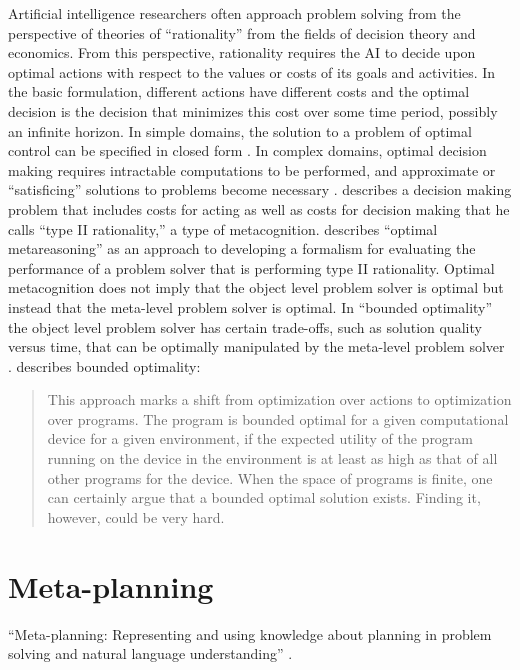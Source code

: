 Artificial intelligence researchers often approach problem solving
from the perspective of theories of ``rationality'' from the fields of
decision theory and economics.  From this perspective, rationality
requires the AI to decide upon optimal actions with respect to the
values or costs of its goals and activities.  In the basic
formulation, different actions have different costs and the optimal
decision is the decision that minimizes this cost over some time
period, possibly an infinite horizon.  In simple domains, the solution
to a problem of optimal control can be specified in closed form
\cite[]{bertsekas:1995}.  In complex domains, optimal decision making
requires intractable computations to be performed, and approximate or
``satisficing'' solutions to problems become necessary
\cite[]{simon:1957,simon:1982}.  \cite{good:1971} describes a decision
making problem that includes costs for acting as well as costs for
decision making that he calls ``type II rationality,'' a type of
metacognition.  \cite{zilberstein:2008} describes ``optimal
metareasoning'' as an approach to developing a formalism for
evaluating the performance of a problem solver that is performing type
II rationality.  Optimal metacognition does not imply that the object
level problem solver is optimal but instead that the meta-level
problem solver is optimal.  In ``bounded optimality'' the object level
problem solver has certain trade-offs, such as solution quality versus
time, that can be optimally manipulated by the meta-level problem
solver \cite[]{russell:1991}.  \cite{zilberstein:2008} describes
bounded optimality:
\begin{quote}
This approach marks a shift from optimization over actions to
optimization over programs.  The program is bounded optimal for a
given computational device for a given environment, if the expected
utility of the program running on the device in the environment is at
least as high as that of all other programs for the device.  When the
space of programs is finite, one can certainly argue that a bounded
optimal solution exists.  Finding it, however, could be very hard.
\end{quote}


\section{Meta-planning}

``Meta-planning: Representing and using knowledge about planning in
problem solving and natural language understanding''
\cite[]{wilensky:1981}.

